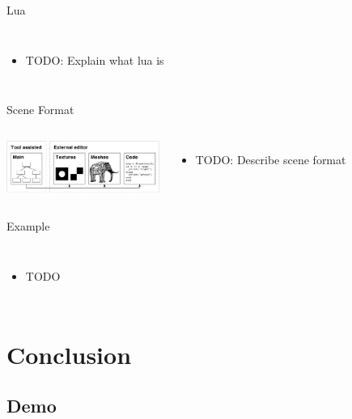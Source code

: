 \documentclass[12pt,ucs,hyperref={pdftext}]{beamer}
\newlength{\columnleft}
\newlength{\columnright}
\begin{document}
\begin{frame}{Lua}
\begin{columns}

\column{\columnleft}

\column{\columnright}
\begin{itemize}%
\item TODO: Explain what lua is
\end{itemize}

\end{columns}
\end{frame}

\begin{frame}{Scene Format}
\begin{columns}

\column{\columnleft}

\begin{center}
\includegraphics[width=5cm]{media/document.pdf}
\end{center}

\column{\columnright}
\begin{itemize}%
\item TODO: Describe scene format
\end{itemize}

\end{columns}
\end{frame}

\begin{frame}{Example}
\begin{columns}

\column{\columnleft}

\column{\columnright}
\begin{itemize}%
\item TODO
\end{itemize}

\end{columns}
\end{frame}


\section{Conclusion}

\subsection{Demo}
\end{document}
